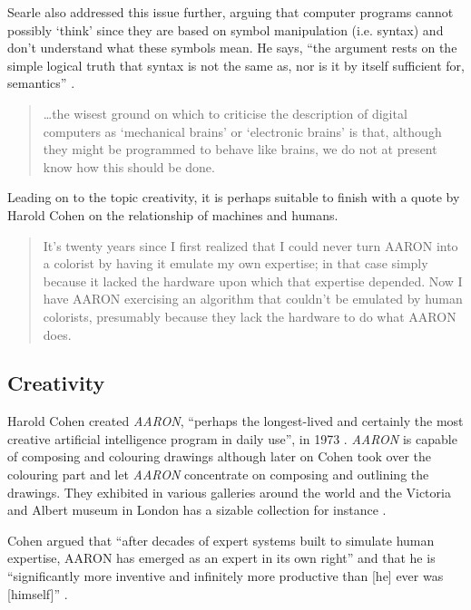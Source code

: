 Searle also addressed this issue further, arguing that computer programs cannot possibly `think' since they are based on symbol manipulation (i.e. syntax) and don't understand what these symbols mean. He says, ``the argument rests on the simple logical truth that syntax is not the same as, nor is it by itself sufficient for, semantics'' \autocite*{Searle1990}.

\begin{quotation}
  \ldots the wisest ground on which to criticise the description of digital computers as `mechanical brains' or `electronic brains' is that, although they might be programmed to behave like brains, we do not at present know how this should be done.  
\end{quotation}

Leading on to the topic creativity, it is perhaps suitable to finish with a quote by Harold Cohen on the relationship of machines and humans.

\begin{quotation}
  It's twenty years since I first realized that I could never turn AARON into a colorist by having it emulate my own expertise; in that case simply because it lacked the hardware upon which that expertise depended. Now I have AARON exercising an algorithm that couldn't be emulated by human colorists, presumably because they lack the hardware to do what AARON does. 
\end{quotation}


\subsection{Creativity}

Harold Cohen created \textit{AARON}, ``perhaps the longest-lived and certainly the most creative artificial intelligence program in daily use'', in 1973 \autocite*{Cohen2016}. \textit{AARON} is capable of composing and colouring drawings although later on Cohen took over the colouring part and let \textit{AARON} concentrate on composing and outlining the drawings. They exhibited in various galleries around the world and the Victoria and Albert museum in London has a sizable collection for instance \autocite{VA2016}.

Cohen argued that ``after decades of expert systems built to simulate human expertise, AARON has emerged as an expert in its own right'' and that he is ``significantly more inventive and infinitely more productive than [he] ever was [himself]'' \autocite*{Cohen2007}.

